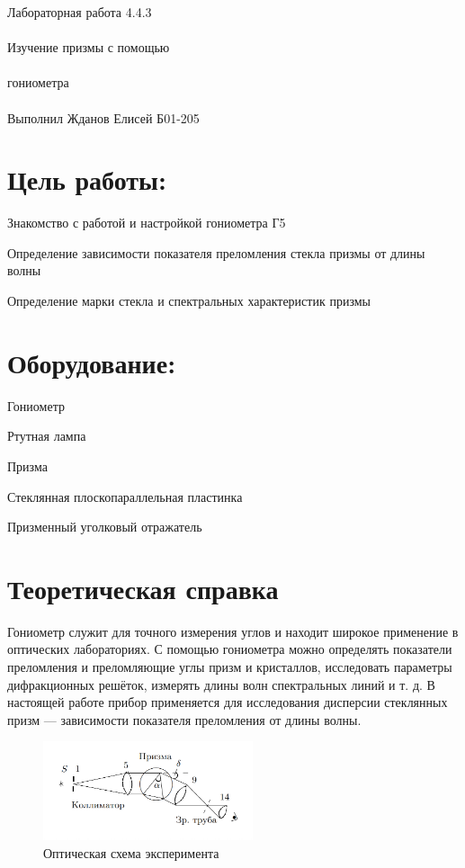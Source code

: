 \documentclass{astroedu-lab}
\begin{document}
\pagestyle{plain}

\begin{problem}{\huge Лабораторная работа 4.4.3\\\\Изучение призмы с помощью\\\\гониометра\\\\Выполнил Жданов Елисей Б01-205}

\section{Цель работы:}

Знакомство с работой и настройкой гониометра Г5

Определение зависимости показателя преломления стекла призмы от
длины волны

Определение марки стекла и спектральных характеристик призмы

\section{Оборудование:}

Гониометр

Ртутная лампа

Призма

Стеклянная плоскопараллельная пластинка

Призменный уголковый отражатель

\section{Теоретическая справка}

Гониометр служит для точного измерения углов и находит широкое применение в оптических лабораториях. С помощью гониометра можно определять показатели преломления и преломляющие углы призм и кристаллов, исследовать параметры дифракционных решёток, измерять длины волн спектральных линий и т. д. В настоящей работе прибор применяется для исследования дисперсии стеклянных призм --- зависимости показателя преломления от длины волны.

	\begin{figure}[h]
		\begin{center}
			\includegraphics[width = 0.55\textwidth]{443-1.png}
			\caption{Оптическая схема эксперимента}
		\end{center}
	\end{figure}


\end{problem}
\end{document}
